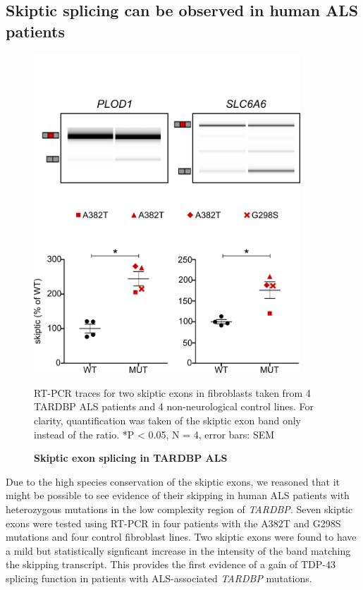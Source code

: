 \subsection{Skiptic splicing can be observed in human ALS patients}
\begin{figure}[h!]
	\centering
	\includegraphics[width=10cm]{Figures/05_tdp_mice/skiptic_patients.png}
	\caption{\textbf{Skiptic exon splicing in TARDBP ALS}}
		RT-PCR traces for two skiptic exons in fibroblasts taken from 4 TARDBP ALS patients and 4 non-neurological control lines. For clarity, quantification was taken of the skiptic exon band only instead of the ratio. *P < 0.05, N = 4, error bars: SEM
	\label{fig:skiptic_patients}
\end{figure}

Due to the high species conservation of the skiptic exons, we reasoned that it might be possible to see evidence of their skipping in human ALS patients with heterozygous mutations in the low complexity region of \textit{TARDBP}. Seven skiptic exons were tested using RT-PCR in four patients with the A382T and G298S mutations and four control fibroblast lines. 
Two skiptic exons were found to have a mild but statistically signficant increase in the intensity of the band matching the skipping transcript.	
This provides the first evidence of a gain of TDP-43 splicing function in patients with ALS-associated \textit{TARDBP} mutations.

